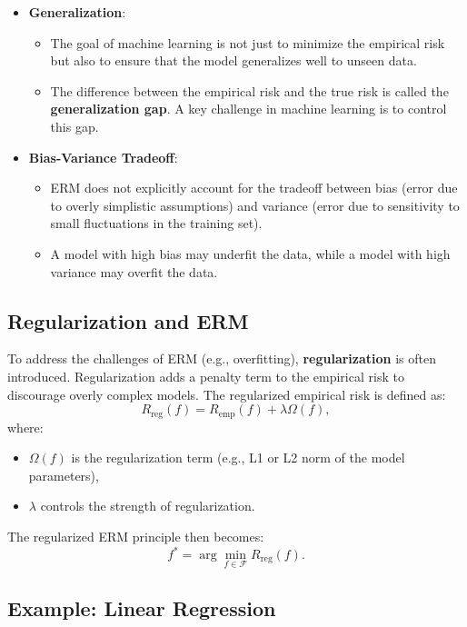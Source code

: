\begin{notechapter}
\begin{itemize}
    \item \textbf{Generalization}:
      \begin{itemize}
          \item The goal of machine learning is not just to minimize the empirical risk but also to ensure that the model generalizes well to unseen data.
          \item The difference between the empirical risk and the true risk is called the \textbf{generalization gap}. A key challenge in machine learning is to control this gap.
      \end{itemize}

    \item \textbf{Bias-Variance Tradeoff}:
      \begin{itemize}
          \item ERM does not explicitly account for the tradeoff between bias (error due to overly simplistic assumptions) and variance (error due to sensitivity to small fluctuations in the training set).
          \item A model with high bias may underfit the data, while a model with high variance may overfit the data.
      \end{itemize}
\end{itemize}

\subsection{Regularization and ERM}

To address the challenges of ERM (e.g., overfitting), \textbf{regularization} is often introduced. Regularization adds a penalty term to the empirical risk to discourage overly complex models. The regularized empirical risk is defined as:
\[
R_{\text{reg}}(f) = R_{\text{emp}}(f) + \lambda \Omega(f),
\]
where:
\begin{itemize}
    \item \( \Omega(f) \) is the regularization term (e.g., L1 or L2 norm of the model parameters),
    \item \( \lambda \) controls the strength of regularization.
\end{itemize}

The regularized ERM principle then becomes:
\[
f^* = \arg\min_{f \in \mathcal{F}} R_{\text{reg}}(f).
\]

\subsection{Example: Linear Regression}


\end{notechapter}
